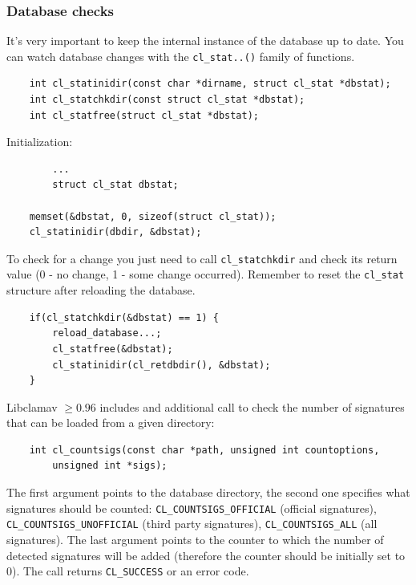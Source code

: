 \documentclass[a4paper,titlepage,12pt]{article}
\begin{document}
    \subsubsection{Database checks}
    It's very important  to keep the internal instance of the database up to
    date. You can watch database changes with the \verb+cl_stat..()+ family
    of functions.
    \begin{verbatim}
	int cl_statinidir(const char *dirname, struct cl_stat *dbstat);
	int cl_statchkdir(const struct cl_stat *dbstat);
	int cl_statfree(struct cl_stat *dbstat);
    \end{verbatim}
    Initialization:
    \begin{verbatim}
	    ...
	    struct cl_stat dbstat;

	memset(&dbstat, 0, sizeof(struct cl_stat));
	cl_statinidir(dbdir, &dbstat);
    \end{verbatim}
    To check for a change you just need to call \verb+cl_statchkdir+ and check
    its return value (0 - no change, 1 - some change occurred). Remember to reset
    the \verb+cl_stat+ structure after reloading the database.
    \begin{verbatim}
	if(cl_statchkdir(&dbstat) == 1) {
	    reload_database...;
	    cl_statfree(&dbstat);
	    cl_statinidir(cl_retdbdir(), &dbstat);
	}
    \end{verbatim}
    Libclamav $\ge0.96$ includes and additional call to check the number of
    signatures that can be loaded from a given directory:
    \begin{verbatim}
	int cl_countsigs(const char *path, unsigned int countoptions,
	    unsigned int *sigs);
    \end{verbatim}
    The first argument points to the database directory, the second one
    specifies what signatures should be counted:
    \verb+CL_COUNTSIGS_OFFICIAL+ (official signatures),\\
    \verb+CL_COUNTSIGS_UNOFFICIAL+ (third party signatures),
    \verb+CL_COUNTSIGS_ALL+ (all signatures). The last argument points
    to the counter to which the number of detected signatures will
    be added (therefore the counter should be initially set to 0).
    The call returns \verb+CL_SUCCESS+ or an error code.
\end{document}
